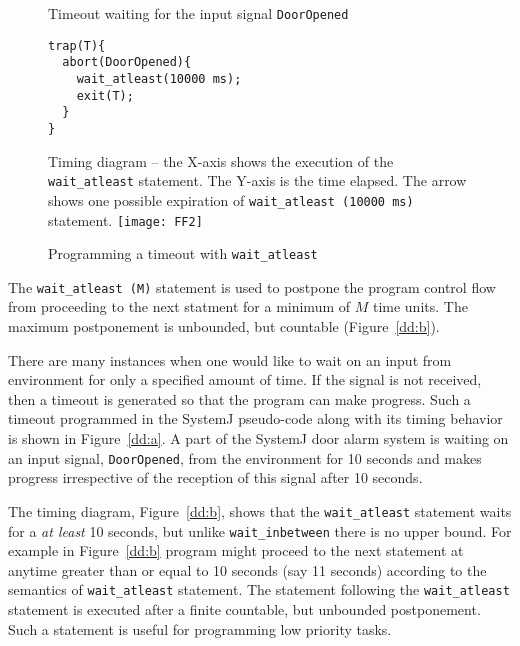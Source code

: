 \begin{figure}[b!]
	\centering
	\vspace{-10pt}
        \begin{SubFloat}{\label{dd:a}Timeout waiting for the input
            signal \texttt{DoorOpened}}
        \begin{lstlisting}[style=sysj,morekeywords={abort,await,emit,present,trap,pause,exit,wait_atleast,suspend}]
trap(T){
  abort(DoorOpened){
    wait_atleast(10000 ms);
    exit(T);  
  }
}
\end{lstlisting}
\end{SubFloat}
\begin{SubFloat}{\label{dd:b}Timing diagram -- the X-axis shows the
    execution of the \texttt{wait\_atleast} statement. The Y-axis is the
    time elapsed. The arrow shows one possible expiration of
    \texttt{wait\_atleast (10000 ms)} statement.}
\texttt{[image: FF2]}
\end{SubFloat}
\caption{Programming a timeout with \texttt{wait\_atleast}}
\label{dd}
\end{figure}

The \texttt{wait\_atleast (M)} statement is used to postpone the program
control flow from proceeding to the next statment for a minimum of $M$
time units. The maximum postponement is unbounded, but countable
(Figure~\ref{dd:b}).

There are many instances when one would like to wait on an input from
environment for only a specified amount of time. If the signal is not
received, then a timeout is generated so that the program can make
progress. Such a timeout programmed in the SystemJ pseudo-code along
with its timing behavior is shown in Figure~\ref{dd:a}. A part of the
SystemJ door alarm system is waiting on an input signal,
\texttt{DoorOpened}, from the environment for 10 seconds and makes
progress irrespective of the reception of this signal after 10 seconds.

The timing diagram, Figure~\ref{dd:b}, shows that the
\texttt{wait\-\_atleast} statement waits for a \textit{at least} 10
seconds, but unlike \texttt{wait\_inbetween} there is no upper bound.
For example in Figure~\ref{dd:b} program might proceed to the next
statement at anytime greater than or equal to 10 seconds (say 11
seconds) according to the semantics of \texttt{wait\_atleast}
statement. The statement following the \texttt{wait\_atleast} statement
is executed after a finite countable, but unbounded postponement. Such a
statement is useful for programming low priority tasks.


